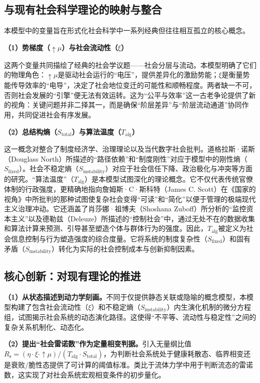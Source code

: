 \documentclass[twocolumn]{ctexart}
\newcommand{\upmu}{\uparrow\!\mu}
\newcommand{\upxi}{\xi}
\newcommand{\upeta}{\eta}
\newcommand{\Sfix}{S_{\mathrm{fixed}}}
\newcommand{\Sinst}{S_{\mathrm{instability}}}
\newcommand{\Stot}{S_{\mathrm{total}}}
\newcommand{\Talg}{T_{\mathrm{alg}}}
\newcommand{\Rs}{R_{\mathrm{s}}}
\begin{document}
\subsection{与现有社会科学理论的映射与整合}

本模型中的变量旨在形式化社会科学中一系列经典但往往相互孤立的核心概念。

\textbf{（1）势梯度（$\upmu$）与社会流动性（$\upxi$）}

这两个变量共同描绘了经典的社会学议题——社会分层与流动\cite{wang2006stratification,li2008stratification}。本模型明确了它们的物理角色：$\upmu$是驱动社会运行的“电压”，提供差异化的激励势能；$\upxi$是衡量势能传导效率的“电导”，决定了社会地位变迁的可能性和顺畅程度。两者缺一不可，否则社会发展的“引擎”便无法有效运转。这为“公平与效率”这一古老争论提供了新的视角：关键问题并非二择其一，而是确保“阶层差异”与“阶层流动通道”协同作用，共同促进社会有序发展。

\textbf{（2）总结构熵（$\Stot$）与算法温度（$\Talg$）}

这一概念对整合了制度经济学、治理理论以及当代数字社会批判。道格拉斯·诺斯（Douglass North）所描述的“路径依赖”和“制度刚性”\cite{north1990institutions}对应于模型中的刚性熵（$\Sfix$）。社会不稳定熵（$\Sinst$）对应于社会信任下降、政治极化与冲突等方面的研究。“算法温度”（$\Talg$）是本模型试图深化的理论概念。它不仅代表传统官僚体制的行政强度，更精确地指向詹姆斯·C·斯科特（James C. Scott）在《国家的视角》\cite{scott1998seeing}中所批判的那种试图使复杂社会变得“可读”和“简化”以便于管理的极端现代主义治理冲动。它还涵盖了肖莎娜·祖博夫（Shoshana Zuboff）所分析的“监控资本主义”\cite{zuboff2019surveillance}以及德勒兹（Deleuze）所描述的“控制社会”\cite{deleuze1992postscript}中，通过无处不在的数据收集和算法计算来预测、引导甚至塑造个体与群体行为的强度。因此，$\Talg$被定义为社会信息控制与行为塑造强度的综合度量。它将系统的制度复杂性（$\Sfix$）和固有矛盾（$\Sinst$）转化为实际的社会控制成本与创新抑制因素。

\subsection{核心创新：对现有理论的推进}

\textbf{（1）从状态描述到动力学刻画。}不同于仅提供静态关联或隐喻的概念模型，本模型构建了包含社会流动性（$\upxi$）和不稳定熵（$\Sinst$）内生演化机制的微分方程组，试图揭示社会系统的动态演化路径。这使得“不平等、流动性与稳定性”之间的复杂关系机制化、动态化。

\textbf{（2）提出“社会雷诺数”作为定量相变判据。}引入无量纲比值$\Rs = (\upeta\cdot\upxi\cdot\upmu)/(\Talg\cdot\Stot)$，为判断社会系统处于健康耗散态、临界相变还是衰败/脆性态提供了可计算的阈值标准。类比于流体力学中用于判断流态的雷诺数，这实现了对社会系统宏观相变条件的初步量化。
\end{document}
